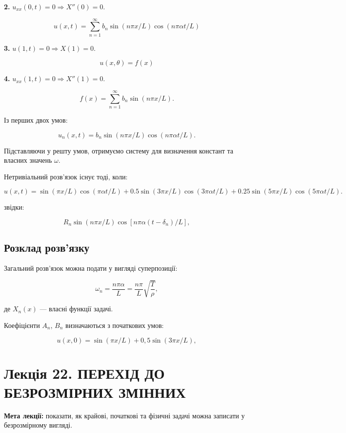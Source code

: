 \documentclass[
  ukrainian,
]{article}
\begin{document}
\textbf{2.} \(u_{xx}(0,t)=0 \Rightarrow X''(0)=0\).

\[
u(x, t) = \sum_{n=1}^{\infty} b_n \sin(n\pi x/L) \cos(n\pi\alpha t/L)
\]

\textbf{3.} \(u(1,t)=0 \Rightarrow X(1)=0\).

\[
u(x, \theta) = f(x)
\]

\textbf{4.} \(u_{xx}(1,t)=0 \Rightarrow X''(1)=0\).

\[
f(x) = \sum_{n=1}^{\infty} b_n \sin(n\pi x/L).
\]

Із перших двох умов:

\[
u_n(x, t) = b_n \sin(n\pi x/L) \cos(n\pi\alpha t/L).
\]

Підставляючи у решту умов, отримуємо систему для визначення констант та
власних значень \(\omega\).

Нетривіальний розв'язок існує тоді, коли:

\[
u(x, t) = \sin(\pi x/L)\cos(\pi \alpha t/L) + 0.5\sin(3\pi x/L)\cos(3\pi \alpha t/L) + 0.25\sin(5\pi x/L)\cos(5\pi \alpha t/L).
\]

звідки:

\[
R_n \sin(n\pi x/L) \cos[n\pi\alpha(t-\delta_n)/L],
\]

\subsection{Розклад
розв'язку}\label{ux440ux43eux437ux43aux43bux430ux434-ux440ux43eux437ux432ux44fux437ux43aux443}

Загальний розв'язок можна подати у вигляді суперпозиції:

\[
\omega_n = \frac{n\pi\alpha}{L} = \frac{n\pi}{L} \sqrt{\frac{T}{\rho}},
\]

де \(X_n(x)\) --- власні функції задачі.

Коефіцієнти \(A_n\), \(B_n\) визначаються з початкових умов:

\[
u(x, 0) = \sin(\pi x/L) + 0,5 \sin(3\pi x/L),
\]

\section{Лекція 22. ПЕРЕХІД ДО БЕЗРОЗМІРНИХ
ЗМІННИХ}\label{ux43bux435ux43aux446ux456ux44f-22.-ux43fux435ux440ux435ux445ux456ux434-ux434ux43e-ux431ux435ux437ux440ux43eux437ux43cux456ux440ux43dux438ux445-ux437ux43cux456ux43dux43dux438ux445}

\textbf{Мета лекції:} показати, як крайові, початкові та фізичні задачі
можна записати у безрозмірному вигляді.
\end{document}
